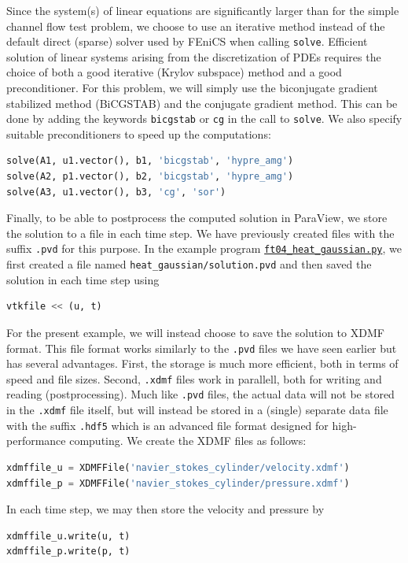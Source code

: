 \documentclass[graybox,envcountchap,sectrefs,final]{svmonodo}
\begin{document}
Since the system(s) of linear equations are significantly larger than
for the simple channel flow test problem, we choose to use an
iterative method instead of the default direct (sparse) solver used by
FEniCS when calling \texttt{solve}. Efficient solution of linear systems
arising from the discretization of PDEs requires the choice of both a
good iterative (Krylov subspace) method and a good
preconditioner. For this problem, we will simply use the biconjugate
gradient stabilized method (BiCGSTAB) and the conjugate gradient method. This can be done by adding the
keywords \texttt{bicgstab} or \texttt{cg} in the call to \texttt{solve}. We also specify
suitable preconditioners to speed up the computations:


\begin{lstlisting}[language=Python,style=graycolor]
solve(A1, u1.vector(), b1, 'bicgstab', 'hypre_amg')
solve(A2, p1.vector(), b2, 'bicgstab', 'hypre_amg')
solve(A3, u1.vector(), b3, 'cg', 'sor')
\end{lstlisting}

Finally, to be able to postprocess the computed solution in ParaView,
we store the solution to a file in each time step. We have previously
created files with the suffix \texttt{.pvd} for this purpose. In the example
program
\href{{https://fenicsproject.org/pub/tutorial/python/vol1/ft04_heat_gaussian.py}}{\nolinkurl{ft04_heat_gaussian.py}},
we first created a file named \Verb!heat_gaussian/solution.pvd! and then
saved the solution in each time step using
\begin{lstlisting}[language=Python,style=graycolor]
vtkfile << (u, t)
\end{lstlisting}

For the present example, we will instead choose to save the solution
to XDMF format. This file format works similarly to the \texttt{.pvd} files
we have seen earlier but has several advantages. First, the storage is
much more efficient, both in terms of speed and file sizes. Second,
\texttt{.xdmf} files work in parallell, both for writing and reading
(postprocessing). Much like \texttt{.pvd} files, the actual data will not be
stored in the \texttt{.xdmf} file itself, but will instead be stored in a
(single) separate data file with the suffix \texttt{.hdf5} which is an
advanced file format designed for high-performance computing.
We create the XDMF files as follows:

\begin{lstlisting}[language=Python,style=graycolor]
xdmffile_u = XDMFFile('navier_stokes_cylinder/velocity.xdmf')
xdmffile_p = XDMFFile('navier_stokes_cylinder/pressure.xdmf')
\end{lstlisting}
In each time step, we may then store the velocity and pressure by
\begin{lstlisting}[language=Python,style=graycolor]
xdmffile_u.write(u, t)
xdmffile_p.write(p, t)
\end{lstlisting}
\end{document}
